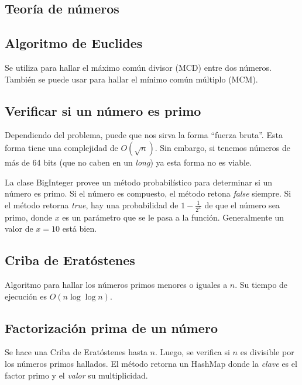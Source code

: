 \documentclass{article}
\begin{document}
\begin{multicols}{2}
\section{Teoría de números}

	\subsection{Algoritmo de Euclides}
	Se utiliza para hallar el máximo común divisor (MCD) entre dos números. También se puede usar para hallar el mínimo común múltiplo (MCM).
	

	\subsection{Verificar si un número es primo}
	Dependiendo del problema, puede que nos sirva la forma ``fuerza bruta''. Esta forma tiene una complejidad de \( O(\sqrt{n}) \). Sin embargo, si tenemos números de más de 64 bits (que no caben en un \emph{long}) ya esta forma no es viable. 
	
	La clase BigInteger provee un método probabilístico para determinar si un número es primo. Si el número es compuesto, el método retona \emph{false} siempre. Si el método retorna \emph{true}, hay una probabilidad de \( 1-\frac{1}{2^x} \) de que el número sea primo, donde \(x\) es un parámetro que se le pasa a la función. Generalmente un valor de \(x = 10\) está bien.
	

	\subsection{Criba  de Eratóstenes}
	Algoritmo para hallar los números primos menores o iguales a \( n \). Su tiempo de ejecución es \( O(n \log \log n) \).
	
	
	\subsection{Factorización prima de un número}
	Se hace una Criba de Eratóstenes hasta \( n \). Luego, se verifica si \( n \) es divisible por los números primos hallados. El método retorna un HashMap donde la \emph{clave} es el factor primo y el \emph{valor} su multiplicidad.
		
	

\end{multicols}
\end{document}
